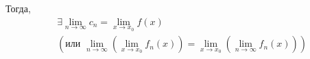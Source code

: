 \documentclass[a4paper, 10pt]{article}
\begin{document}
Тогда,
\begin{equation*}
    \begin{aligned}
        &\exists\lim\limits_{n\to\infty} c_n=\lim\limits_{x\to x_0} f(x)\\
        &\left(\text{или }\lim\limits_{n\to\infty} \left(\lim_{x\to x_0} f_n(x)\right)=\lim_{x\to x_0}\left(\lim_{n\to\infty} f_n(x)\right)\right)
    \end{aligned}
\end{equation*}
\end{document}

